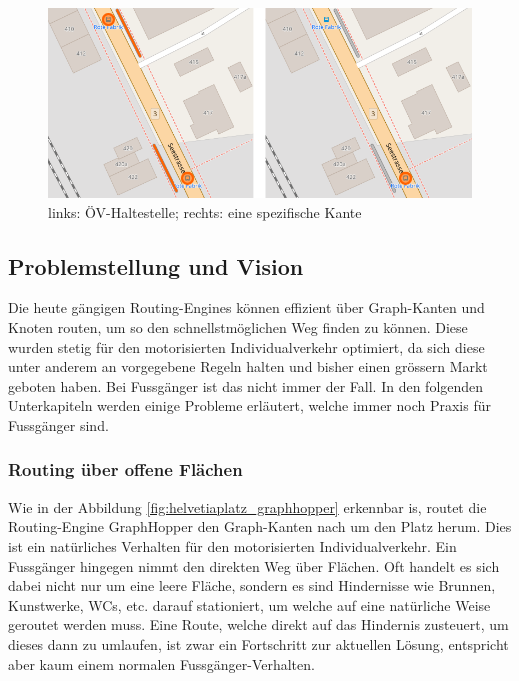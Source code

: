 \begin{figure}[ht]
\centering
\includegraphics[width=0.7\linewidth]{technicalreport/img/public_transport_stop}
\caption[Unterschied ÖV-Haltestelle und Kante]{links: ÖV-Haltestelle; rechts: eine spezifische Kante}
\label{fig:public_transport_stop}
\end{figure}


\subsection{Problemstellung und Vision}
\label{Problemstellung und Vision}
Die heute gängigen Routing-Engines können effizient über Graph-Kanten und Knoten routen, um so den schnellstmöglichen Weg finden zu können. Diese wurden stetig für den motorisierten Individualverkehr optimiert, da sich diese unter anderem an vorgegebene Regeln halten und bisher einen grössern Markt geboten haben. Bei Fussgänger ist das nicht immer der Fall. In den folgenden Unterkapiteln werden einige Probleme erläutert, welche immer noch Praxis für Fussgänger sind.

\subsubsection{Routing über offene Flächen}
\label{problem:Routing über offene Flächen}
Wie in der Abbildung \ref{fig:helvetiaplatz_graphhopper} erkennbar is, routet die Routing-Engine GraphHopper \cite{graphhopper} den Graph-Kanten nach um den Platz herum. Dies ist ein natürliches Verhalten für den motorisierten Individualverkehr. Ein Fussgänger hingegen nimmt den direkten Weg über Flächen. Oft handelt es sich dabei nicht nur um eine leere Fläche, sondern es sind Hindernisse wie Brunnen, Kunstwerke, WCs, etc. darauf stationiert, um welche auf eine natürliche Weise geroutet werden muss. Eine Route, welche direkt auf das Hindernis zusteuert, um dieses dann zu umlaufen, ist zwar ein Fortschritt zur aktuellen Lösung, entspricht aber kaum einem normalen Fussgänger-Verhalten. 

